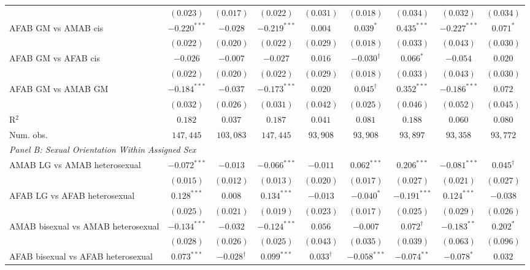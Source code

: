 \begin{table}[htpb!]
{\begin{tabular}{l c c c c c c c c}
 & $(0.023)$ & $(0.017)$ & $(0.022)$ & $(0.031)$ & $(0.018)$ & $(0.034)$ & $(0.032)$ & $(0.034)$ \\
AFAB GM vs AMAB cis & $-0.220^{***}$ & $-0.028$ & $-0.219^{***}$ & $0.004$ & $0.039^{*}$ & $0.435^{***}$ & $-0.227^{***}$ & $0.071^{*}$ \\
 & $(0.022)$ & $(0.020)$ & $(0.022)$ & $(0.029)$ & $(0.018)$ & $(0.033)$ & $(0.043)$ & $(0.030)$ \\
AFAB GM vs AFAB cis & $-0.026$ & $-0.007$ & $-0.027$ & $0.016$ & $-0.030^{\dagger}$ & $0.066^{*}$ & $-0.054$ & $0.020$ \\
 & $(0.022)$ & $(0.020)$ & $(0.022)$ & $(0.029)$ & $(0.018)$ & $(0.033)$ & $(0.043)$ & $(0.030)$ \\
AFAB GM vs AMAB GM & $-0.184^{***}$ & $-0.037$ & $-0.173^{***}$ & $0.020$ & $0.045^{\dagger}$ & $0.352^{***}$ & $-0.186^{***}$ & $0.072$ \\
 & $(0.032)$ & $(0.026)$ & $(0.031)$ & $(0.042)$ & $(0.025)$ & $(0.046)$ & $(0.052)$ & $(0.045)$ \\
\hline
R$^2$ & $0.182$ & $0.037$ & $0.187$ & $0.041$ & $0.081$ & $0.188$ & $0.060$ & $0.080$ \\
Num. obs. & $147,445$ & $103,083$ & $147,445$ & $93,908$ & $93,908$ & $93,897$ & $93,358$ & $93,772$ \\
\hline
\multicolumn{9}{l}{\textit{Panel B: Sexual Orientation Within Assigned Sex}} \\
AMAB LG vs AMAB heterosexual & $-0.072^{***}$ & $-0.013$ & $-0.066^{***}$ & $-0.011$ & $0.062^{***}$ & $0.206^{***}$ & $-0.081^{***}$ & $0.045^{\dagger}$ \\
 & $(0.015)$ & $(0.012)$ & $(0.013)$ & $(0.020)$ & $(0.017)$ & $(0.027)$ & $(0.021)$ & $(0.027)$ \\
AFAB LG vs AFAB heterosexual & $0.128^{***}$ & $0.008$ & $0.134^{***}$ & $-0.013$ & $-0.040^{*}$ & $-0.191^{***}$ & $0.124^{***}$ & $-0.038$ \\
 & $(0.025)$ & $(0.021)$ & $(0.019)$ & $(0.023)$ & $(0.017)$ & $(0.025)$ & $(0.029)$ & $(0.026)$ \\
AMAB bisexual vs AMAB heterosexual & $-0.134^{***}$ & $-0.032$ & $-0.124^{***}$ & $0.056$ & $-0.007$ & $0.072^{\dagger}$ & $-0.183^{**}$ & $0.202^{*}$ \\
 & $(0.028)$ & $(0.026)$ & $(0.025)$ & $(0.043)$ & $(0.035)$ & $(0.039)$ & $(0.063)$ & $(0.096)$ \\
AFAB bisexual vs AFAB heterosexual & $0.073^{***}$ & $-0.028^{\dagger}$ & $0.099^{***}$ & $0.033^{\dagger}$ & $-0.058^{***}$ & $-0.074^{**}$ & $-0.078^{*}$ & $0.032$ \\

\end{tabular}}
\end{table}
